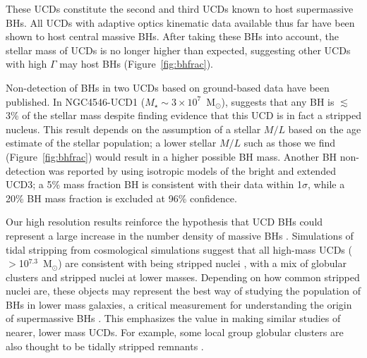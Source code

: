 \documentclass{aastex}
\begin{document}


These UCDs constitute the second and third UCDs known to host supermassive BHs. All UCDs with adaptive optics kinematic data available thus far have been shown to host central massive BHs.  After taking these BHs into account, the stellar mass of UCDs is no longer higher than expected, suggesting other UCDs with high $\Gamma$ may host BHs (Figure~\ref{fig:bhfrac}).

Non-detection of BHs in two UCDs based on ground-based data have been published. In NGC4546-UCD1 ($M_\star \sim 3 \times 10^7$~M$_\odot$), \citet{norris15} suggests that any BH is $\lesssim$3\% of the stellar mass despite finding evidence that this UCD is in fact a stripped nucleus.  This result depends on the assumption of a stellar $M/L$ based on the age estimate of the stellar population; a lower stellar $M/L$ such as those we find (Figure~\ref{fig:bhfrac}) would result in a higher possible BH mass.  Another BH non-detection was reported by \citet{frank11} using isotropic models of the bright and extended UCD3; a 5\% mass fraction BH is consistent with their data within 1$\sigma$, while a 20\% BH mass fraction is excluded at 96\% confidence.

Our high resolution results reinforce the hypothesis that UCD BHs could represent a large increase in the number density of massive BHs \citep{seth14}.  Simulations of tidal stripping from cosmological simulations suggest that all high-mass UCDs ($>$10$^{7.3}$~M$_\odot$) are consistent with being stripped nuclei \citep{pfeffer14,pfeffer16}, with a mix of globular clusters and stripped nuclei at lower masses.  Depending on how common stripped nuclei are, these objects may represent the best way of studying the population of BHs in lower mass galaxies, a critical measurement for understanding the origin of supermassive BHs \citep{volonteri10}.  This emphasizes the value in making similar studies of nearer, lower mass UCDs.  For example, some local group globular clusters are also thought to be tidally stripped remnants \citep[e.g., $\omega$ Cen, G1][]{norris97,meylan01}.
\end{document}
